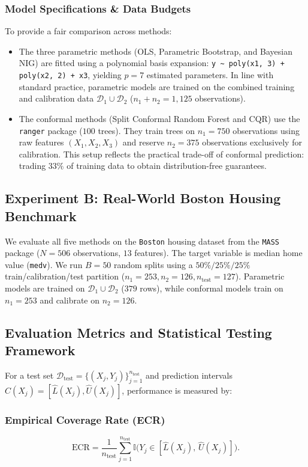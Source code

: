\documentclass[journal]{IEEEtran}
\begin{document}
\subsubsection{Model Specifications \& Data Budgets}
To provide a fair comparison across methods:
\begin{itemize}
    \item The three parametric methods (OLS, Parametric Bootstrap, and Bayesian NIG) are fitted using a polynomial basis expansion:
    \texttt{y \textasciitilde{} poly(x1, 3) + poly(x2, 2) + x3}, yielding $p = 7$ estimated parameters. In line with standard practice, parametric models are trained on the combined training and calibration data $\mathcal{D}_1 \cup \mathcal{D}_2$ ($n_1 + n_2 = 1,125$ observations).
    \item The conformal methods (Split Conformal Random Forest and CQR) use the \texttt{ranger} package ($100$ trees). They train trees on $n_1 = 750$ observations using raw features $(X_1, X_2, X_3)$ and reserve $n_2 = 375$ observations exclusively for calibration. This setup reflects the practical trade-off of conformal prediction: trading $33\%$ of training data to obtain distribution-free guarantees.
\end{itemize}

\subsection{Experiment B: Real-World Boston Housing Benchmark}
We evaluate all five methods on the \texttt{Boston} housing dataset from the \texttt{MASS} package ($N = 506$ observations, $13$ features). The target variable is median home value (\texttt{medv}). We run $B = 50$ random splits using a $50\% / 25\% / 25\%$ train/calibration/test partition ($n_1 = 253, n_2 = 126, n_{\text{test}} = 127$). Parametric models are trained on $\mathcal{D}_1 \cup \mathcal{D}_2$ ($379$ rows), while conformal models train on $n_1 = 253$ and calibrate on $n_2 = 126$.

\subsection{Evaluation Metrics and Statistical Testing Framework}
For a test set $\mathcal{D}_{\text{test}} = \{(X_j, Y_j)\}_{j=1}^{n_{\text{test}}}$ and prediction intervals $\hat{C}(X_j) = [\hat{L}(X_j), \hat{U}(X_j)]$, performance is measured by:

\subsubsection{Empirical Coverage Rate (ECR)}
\begin{equation}
\text{ECR} = \frac{1}{n_{\text{test}}} \sum_{j=1}^{n_{\text{test}}} \mathbb{I}\Big(Y_j \in [\hat{L}(X_j), \, \hat{U}(X_j)]\Big).
\end{equation}
\end{document}
